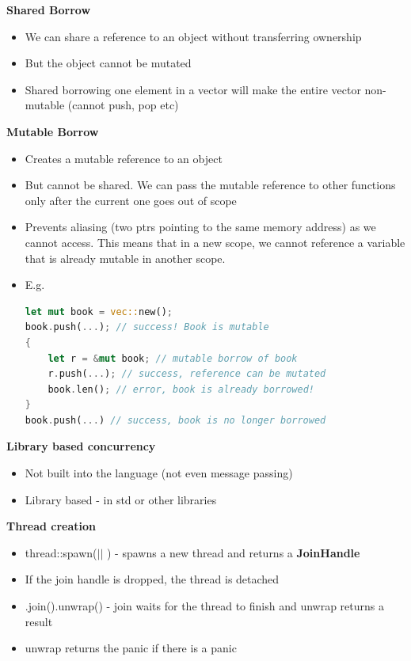 \documentclass[10pt, landscape]{article}
\begin{document}
\begin{multicols}{4}
\textbf{Shared Borrow} \\ 
\begin{itemize}
    \item We can share a reference to an object without transferring ownership
    \item But the object cannot be mutated
    \item Shared borrowing one element in a vector will make the entire vector non-mutable (cannot push, pop etc)
\end{itemize} 

\textbf{Mutable Borrow} \\
\begin{itemize}
    \item Creates a mutable reference to an object 
    \item But cannot be shared. We can pass the mutable reference to other functions only after the current one goes out of scope
    \item Prevents aliasing (two ptrs pointing to the same memory address) as we cannot access. This means that in a new scope, we cannot reference a variable that is already mutable in another scope. 
    \item E.g.
    \begin{lstlisting}[language=Rust, breaklines=true, breakatwhitespace=true]
let mut book = vec::new();
book.push(...); // success! Book is mutable 
{
    let r = &mut book; // mutable borrow of book
    r.push(...); // success, reference can be mutated 
    book.len(); // error, book is already borrowed!
}
book.push(...) // success, book is no longer borrowed
    \end{lstlisting}
\end{itemize}

\textbf{Library based concurrency} \\ 
\begin{itemize}
    \item Not built into the language (not even message passing)
    \item Library based - in std or other libraries
\end{itemize}


\textbf{Thread creation} \\
\begin{itemize}
    \item thread::spawn($| |$ {}) - spawns a new thread and returns a \textbf{JoinHandle}
    \item If the join handle is dropped, the thread is detached
    \item .join().unwrap() - join waits for the thread to finish and unwrap returns a result
    \item unwrap returns the panic if there is a panic
\end{itemize}


\end{multicols}
\end{document}
